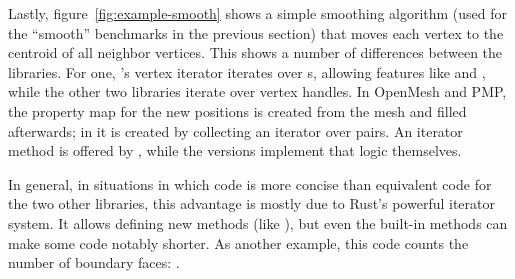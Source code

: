 Lastly, figure~\ref{fig:example-smooth} shows a simple smoothing algorithm (used for the \enquote{smooth} benchmarks in the previous section) that moves each vertex to the centroid of all neighbor vertices.
This shows a number of differences between the libraries.
For one, 's vertex iterator iterates over s, allowing features like  and , while the other two libraries iterate over vertex handles.
In OpenMesh and PMP, the property map for the new positions is created from the mesh and filled afterwards; in  it is created by collecting an iterator over  pairs.
An iterator method  is offered by , while the versions implement that logic themselves.

In general, in situations in which  code is more concise than equivalent code for the two other libraries, this advantage is mostly due to Rust's powerful iterator system.
It allows defining new methods (like ), but even the built-in methods can make some code notably shorter.
As another example, this code counts the number of boundary faces: .


